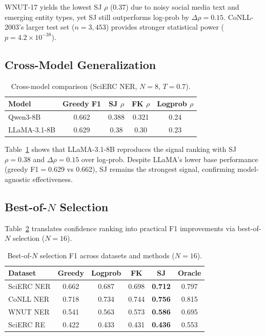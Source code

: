 \documentclass[11pt,a4paper]{article}
\begin{document}
WNUT-17 yields the lowest SJ $\rho$ (0.37) due to noisy social media text and emerging entity types, yet SJ still outperforms log-prob by $\Delta\rho{=}0.15$. CoNLL-2003's larger test set ($n{=}3{,}453$) provides stronger statistical power ($p{=}4.2 \times 10^{-38}$).

\subsection{Cross-Model Generalization}
\label{sec:crossmodel}

\begin{table}[t]
\centering
\small
\caption{Cross-model comparison (SciERC NER, $N{=}8$, $T{=}0.7$).}
\label{tab:crossmodel}
\begin{tabular}{lcccc}
\toprule
\textbf{Model} & \textbf{Greedy F1} & \textbf{SJ $\rho$} & \textbf{FK $\rho$} & \textbf{Logprob $\rho$} \\
\midrule
Qwen3-8B & 0.662 & 0.388 & 0.321 & 0.24 \\
LLaMA-3.1-8B & 0.629 & 0.38 & 0.30 & 0.23 \\
\bottomrule
\end{tabular}
\end{table}

Table~\ref{tab:crossmodel} shows that LLaMA-3.1-8B reproduces the signal ranking with SJ $\rho{=}0.38$ and $\Delta\rho{=}0.15$ over log-prob. Despite LLaMA's lower base performance (greedy F1$=$0.629 vs 0.662), SJ remains the strongest signal, confirming model-agnostic effectiveness.

\subsection{Best-of-$N$ Selection}
\label{sec:bestofn}

Table~\ref{tab:bestofn} translates confidence ranking into practical F1 improvements via best-of-$N$ selection ($N{=}16$).

\begin{table}[t]
\centering
\small
\caption{Best-of-$N$ selection F1 across datasets and methods ($N{=}16$).}
\label{tab:bestofn}
\begin{tabular}{lccccc}
\toprule
\textbf{Dataset} & \textbf{Greedy} & \textbf{Logprob} & \textbf{FK} & \textbf{SJ} & \textbf{Oracle} \\
\midrule
SciERC NER  & 0.662 & 0.687 & 0.698 & \textbf{0.712} & 0.797 \\
CoNLL NER   & 0.718 & 0.734 & 0.744 & \textbf{0.756} & 0.815 \\
WNUT NER    & 0.541 & 0.563 & 0.573 & \textbf{0.586} & 0.695 \\
SciERC RE   & 0.422 & 0.433 & 0.431 & \textbf{0.436} & 0.553 \\
\bottomrule
\end{tabular}
\end{table}
\end{document}
